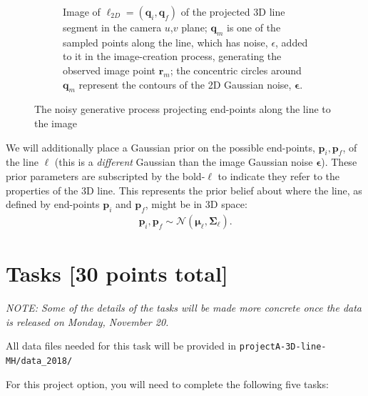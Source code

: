 \documentclass[10pt]{article}
\begin{document}
\begin{figure}
\begin{subfigure}{.4\textwidth}
  \caption{Image of $\boldsymbol{\ell}_{2D} = (\mathbf{q}_i, \mathbf{q}_f)$ of the projected 3D line segment in the camera $u$,$v$ plane; $\mathbf{q}_m$ is one of the sampled points along the line, which has noise, $\epsilon$, added to it in the image-creation process, generating the observed image point $\mathbf{r}_m$; the concentric circles around $\mathbf{q}_m$ represent the contours of the 2D Gaussian noise, $\boldsymbol{\epsilon}$.}
  \label{fig:2d}
\end{subfigure}
\caption{The noisy generative process projecting end-points along the line to the image\label{fig:line-gen}}
\end{figure}

We will additionally place a Gaussian prior on the possible end-points, $\mathbf{p}_i, \mathbf{p}_f$, of the line $\boldsymbol{\ell}$ (this is a {\em different} Gaussian than the image Gaussian noise $\boldsymbol{\epsilon}$).  These prior parameters are subscripted by the bold-$\boldsymbol{\ell}$ to indicate they refer to the properties of the 3D line.  This represents the prior belief about where the line, as defined by end-points $\mathbf{p}_i$ and $\mathbf{p}_f$, might be in 3D space:
\begin{eqnarray*}
\mathbf{p}_i, \mathbf{p}_f \sim \mathcal{N}(\boldsymbol{\mu}_{\boldsymbol{\ell}}, \boldsymbol{\Sigma}_{\boldsymbol{\ell}}) .
\end{eqnarray*}

\newpage
\section*{Tasks [30 points total]}

{\em NOTE: Some of the details of the tasks will be made more concrete once the data is released on Monday, November 20.}

All data files needed for this task will be provided in {\tt projectA-3D-line-MH/data\_2018/}

For this project option, you will need to complete the following five tasks:
\end{document}

